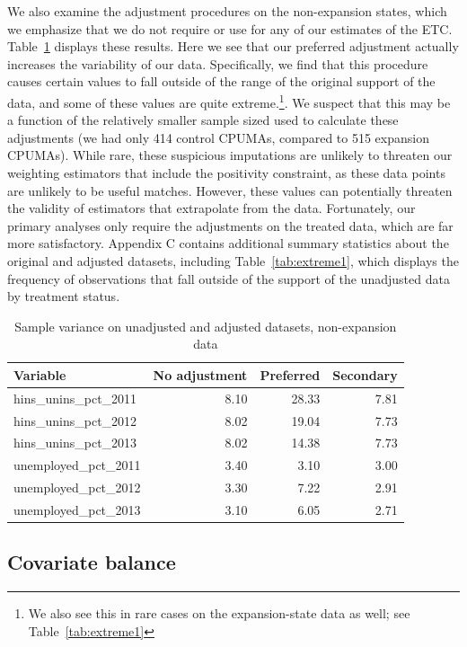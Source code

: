 \documentclass[aoas]{imsart}
\theoremstyle{plain}
\theoremstyle{remark}
\begin{document}
We also examine the adjustment procedures on the non-expansion states, which we emphasize that we do not require or use for any of our estimates of the ETC. Table~\ref{tab:adjust2} displays these results. Here we see that our preferred adjustment actually increases the variability of our data. Specifically, we find that this procedure causes certain values to fall outside of the range of the original support of the data, and some of these values are quite extreme.\footnote{We also see this in rare cases on the expansion-state data as well; see Table~\ref{tab:extreme1}}. We suspect that this may be a function of the relatively smaller sample sized used to calculate these adjustments (we had only 414 control CPUMAs, compared to 515 expansion CPUMAs). While rare, these suspicious imputations are unlikely to threaten our weighting estimators that include the positivity constraint, as these data points are unlikely to be useful matches. However, these values can potentially threaten the validity of estimators that extrapolate from the data. Fortunately, our primary analyses only require the adjustments on the treated data, which are far more satisfactory. Appendix C contains additional summary statistics about the original and adjusted datasets, including Table~\ref{tab:extreme1}, which displays the frequency of observations that fall outside of the support of the unadjusted data by treatment status.

\begin{table}[ht]
\caption{Sample variance on unadjusted and adjusted datasets, non-expansion data}
\label{tab:adjust2}
\begin{tabular}{lrrr}
  \hline
Variable & No adjustment & Preferred & Secondary \\ 
  \hline
  hins\_unins\_pct\_2011 & 8.10 & 28.33 & 7.81 \\ 
  hins\_unins\_pct\_2012 & 8.02 & 19.04 & 7.73 \\ 
  hins\_unins\_pct\_2013 & 8.02 & 14.38 & 7.73 \\ 
  unemployed\_pct\_2011 & 3.40 & 3.10 & 3.00 \\ 
  unemployed\_pct\_2012 & 3.30 & 7.22 & 2.91 \\ 
  unemployed\_pct\_2013 & 3.10 & 6.05 & 2.71 \\ 
   \hline
\end{tabular}
\end{table}

\subsection{Covariate balance}
\end{document}
